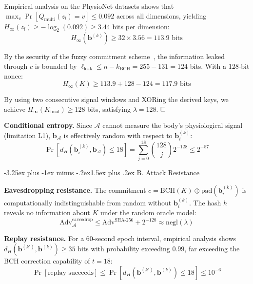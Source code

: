 \documentclass[10pt,twocolumn]{article}
\makeatletter
\renewcommand{\subsection}{\@startsection{subsection}{2}{\z@}%
  {-3.25ex plus -1ex minus -.2ex}{1.5ex plus .2ex}%
  {\normalfont\normalsize\bfseries\itshape}}
\makeatother
\begin{document}
Empirical analysis on the PhysioNet datasets shows that $\max_v \Pr[Q_{\text{multi}}(z_l) = v] \leq 0.092$ across all dimensions, yielding $H_\infty(z_l) \geq -\log_2(0.092) \geq 3.44$ bits per dimension:
\begin{equation}
H_\infty(\mathbf{b}^{(k)}) \geq 32 \times 3.56 = 113.9 \text{ bits}
\end{equation}

By the security of the fuzzy commitment scheme~\cite{dodis2008fuzzy}, the information leaked through $c$ is bounded by $\ell_{\text{leak}} \leq n - k_{\text{BCH}} = 255 - 131 = 124$ bits. With a 128-bit nonce:
\begin{equation}
H_\infty(K) \geq 113.9 + 128 - 124 = 117.9 \text{ bits}
\end{equation}

By using two consecutive signal windows and XORing the derived keys, we achieve $H_\infty(K_{\text{final}}) \geq 128$ bits, satisfying $\lambda = 128$. $\hfill\square$

\textbf{Conditional entropy.} Since $\mathcal{A}$ cannot measure the body's physiological signal (limitation L1), $\mathbf{b}_{\mathcal{A}}$ is effectively random with respect to $\mathbf{b}_i^{(k)}$:
\begin{equation}
\Pr[d_H(\mathbf{b}_i^{(k)}, \mathbf{b}_{\mathcal{A}}) \leq 18] = \sum_{j=0}^{18} \binom{128}{j} 2^{-128} \leq 2^{-57}
\end{equation}

\subsection{B. Attack Resistance}
\label{subsec:attack_resistance}

\textbf{Eavesdropping resistance.} The commitment $c = \text{BCH}(K) \oplus \text{pad}(\mathbf{b}_i^{(k)})$ is computationally indistinguishable from random without $\mathbf{b}_i^{(k)}$. The hash $h$ reveals no information about $K$ under the random oracle model:
\begin{equation}
\text{Adv}_{\mathcal{A}}^{\text{eavesdrop}} \leq \text{Adv}^{\text{SHA-256}} + 2^{-128} \approx \text{negl}(\lambda)
\end{equation}

\textbf{Replay resistance.} For a 60-second epoch interval, empirical analysis shows $d_H(\mathbf{b}^{(k')}, \mathbf{b}^{(k)}) \geq 35$ bits with probability exceeding $0.99$, far exceeding the BCH correction capability of $t = 18$:
\begin{equation}
\Pr[\text{replay succeeds}] \leq \Pr[d_H(\mathbf{b}^{(k')}, \mathbf{b}^{(k)}) \leq 18] \leq 10^{-6}
\end{equation}
\end{document}
